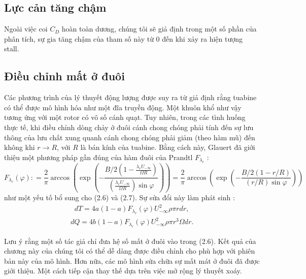 \documentclass[a4paper,twoside,13pt]{extbook}
\begin{document}
\subsection{Lực cản tăng chậm}

Ngoài việc coi $C_D$ hoàn toàn dương, chúng tôi sẽ giả định trong một số phần của phân tích, sự gia tăng chậm của tham số này từ 0 đến khi xảy ra hiện tượng stall.
\subsection{Điều chỉnh mất ở đuôi}

Các phương trình của lý thuyết động lượng được suy ra từ giả định rằng tuabine có thể được mô hình hóa như một đĩa truyền động. Một khuôn khổ như vậy tương ứng với một rotor có vô số cánh quạt. Tuy nhiên, trong các tình huống thực tế, khi điều chỉnh dòng chảy ở đuôi cánh chong chóng phải tính đến sự lưu thông của lưu chất xung quanh cánh chong chóng phải giảm (theo hàm mũ) đến không khi $r\rightarrow R$, với $R$ là bán kính của tuabine. Bằng cách này, Glauert đã giới thiệu một phương pháp gần đúng của hàm đuôi của Prandtl $F_{\lambda_r}$ :
$$
{F_{{\lambda _r}}}\left( \varphi  \right): = \frac{2}{\pi }\arccos \left( {\exp \left( { - \frac{{B/2\left( {1 - \frac{{{\lambda _r}{U_{ - \infty }}}}{{\Omega R}}} \right)}}{{\left( {\frac{{{\lambda _r}{U_{ - \infty }}}}{{\Omega R}}} \right)\sin \varphi }}} \right)} \right) = \frac{2}{\pi }\arccos \left( {\exp \left( { - \frac{{B/2\left( {1 - r/R} \right)}}{{\left( {r/R} \right)\sin \varphi }}} \right)} \right)
$$
như một yếu tố bổ sung cho (2.6) và (2.7). Sự sửa đổi này làm phát sinh :
\begin{equation}\label{eq:1_16}
    \begin{aligned}
        dT = 4a\left( {1 - a} \right){F_{{\lambda _r}}}\left( \varphi  \right)U_{ - \infty }^2\rho \pi rdr,
    \end{aligned}
\end{equation}
\begin{equation}\label{eq:1_17}
    \begin{aligned}
        dQ = 4b\left( {1 - a} \right){F_{{\lambda _r}}}\left( \varphi  \right)U_{ - \infty }^2\rho \pi {r^3}\Omega dr.
    \end{aligned}
\end{equation}

Lưu ý rằng một số tác giả chỉ đưa hệ số mất ở đuôi vào trong (2.6). Kết quả
của chương này của chúng tôi có thể dễ dàng được điều chỉnh cho phù hợp với phiên bản này của mô hình. Hơn nữa, các mô hình sửa chữa sự mất mát ở đuôi đã được giới thiệu. Một cách tiếp cận thay thế dựa trên việc mở rộng lý thuyết xoáy.
\end{document}
